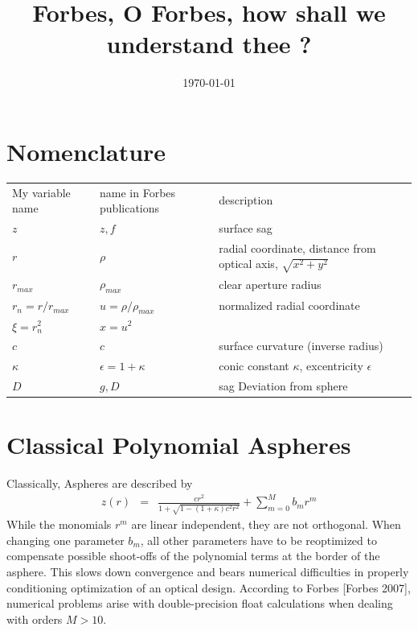 \documentclass[10pt]{revtex4-1}
\renewcommand\r{r}
\newcommand\rmax{r_{max}}
\newcommand\rnorm{r_{n}}
\begin{document}

\title{Forbes, O Forbes, how shall we understand thee ?}

\author{}
\email{}
\affiliation{}

\date{\today}



\maketitle
\pagestyle{headings}



\section{Nomenclature}

\begin{tabular}{l|l|l}
    My variable name 								& name in Forbes publications & description \\
		$z$ 														& $z,f$												& surface sag \\
		$\r$														& $\rho$											& radial coordinate, distance from optical axis, $\sqrt{x^2+y^2}$ \\
		$\rmax$													& $\rho_{max}$								& clear aperture radius \\
		$\rnorm = \r / \rmax$						& $u = \rho / \rho_{max}$			& normalized radial coordinate \\
		$\xi = \rnorm^2$								& $x = u^2$ 									& \\
		$c$ 														& $c$													& surface curvature (inverse radius) \\
		$\kappa$												& $\epsilon = 1 + \kappa$			& conic constant $\kappa$, excentricity $\epsilon$ \\
		$D$															& $g,D$												& sag Deviation from sphere
\end{tabular}		

\section{Classical Polynomial Aspheres}

Classically, Aspheres are described by
\begin{eqnarray}
	z(\r) &=& \frac{c \r^2}{1+\sqrt{1-(1+\kappa)c^2 \r^2}} + \sum_{m=0}^M b_m \r^m
\end{eqnarray}
While the monomials $\r^m$ are linear independent, they are not orthogonal. When changing one parameter $b_m$, all other parameters have to be reoptimized to compensate possible shoot-offs of the polynomial terms at the border of the asphere. This slows down convergence and bears numerical difficulties in properly conditioning optimization of an optical design. According to Forbes [Forbes 2007], numerical problems arise with double-precision float calculations when dealing with orders $M > 10$.
\end{document}
